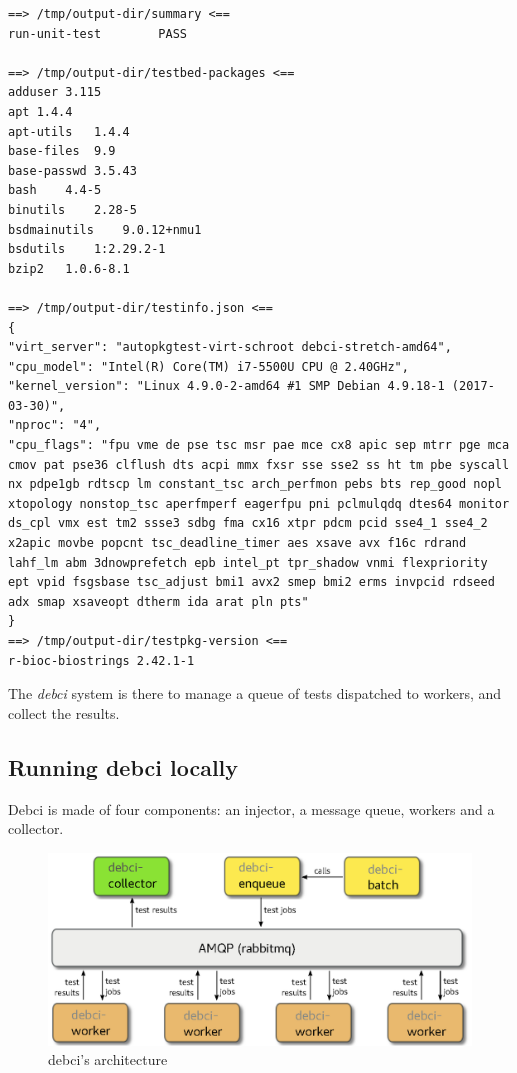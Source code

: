 \documentclass[mingoth,a4paper]{jsarticle}
\begin{document}
{{\begin{verbatim}
==> /tmp/output-dir/summary <==
run-unit-test        PASS

==> /tmp/output-dir/testbed-packages <==
adduser 3.115
apt 1.4.4
apt-utils   1.4.4
base-files  9.9
base-passwd 3.5.43
bash    4.4-5
binutils    2.28-5
bsdmainutils    9.0.12+nmu1
bsdutils    1:2.29.2-1
bzip2   1.0.6-8.1

==> /tmp/output-dir/testinfo.json <==
{
"virt_server": "autopkgtest-virt-schroot debci-stretch-amd64",
"cpu_model": "Intel(R) Core(TM) i7-5500U CPU @ 2.40GHz",
"kernel_version": "Linux 4.9.0-2-amd64 #1 SMP Debian 4.9.18-1 (2017-03-30)",
"nproc": "4",
"cpu_flags": "fpu vme de pse tsc msr pae mce cx8 apic sep mtrr pge mca cmov pat pse36 clflush dts acpi mmx fxsr sse sse2 ss ht tm pbe syscall nx pdpe1gb rdtscp lm constant_tsc arch_perfmon pebs bts rep_good nopl xtopology nonstop_tsc aperfmperf eagerfpu pni pclmulqdq dtes64 monitor ds_cpl vmx est tm2 ssse3 sdbg fma cx16 xtpr pdcm pcid sse4_1 sse4_2 x2apic movbe popcnt tsc_deadline_timer aes xsave avx f16c rdrand lahf_lm abm 3dnowprefetch epb intel_pt tpr_shadow vnmi flexpriority ept vpid fsgsbase tsc_adjust bmi1 avx2 smep bmi2 erms invpcid rdseed adx smap xsaveopt dtherm ida arat pln pts"
}
==> /tmp/output-dir/testpkg-version <==
r-bioc-biostrings 2.42.1-1
\end{verbatim}

The \emph{debci} system is there to manage a queue of tests dispatched
to workers, and collect the results.

\subsection{Running debci locally}\label{running-debci-locally}

Debci is made of four components: an injector, a message queue, workers
and a collector.

\begin{figure}[htbp]
\centering
\includegraphics{./image201706/architecture.eps}
\caption{debci's architecture}
\end{figure}

}}
\end{document}
